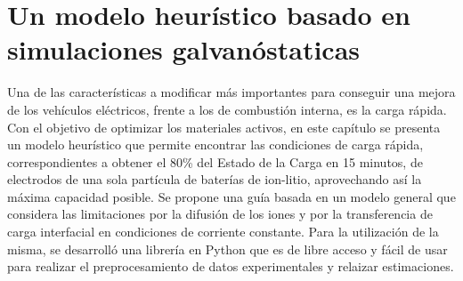 \chapter{Un modelo heurístico basado en simulaciones galvanóstaticas}\label{ch:un}
\thispagestyle{empty}

\vspace{50pt}

\begin{adjustwidth}{50pt}{50pt}
    Una de las características a modificar más importantes para conseguir una mejora de los 
    vehículos eléctricos, frente a los de combustión interna, es la carga rápida.
    Con el objetivo de optimizar los materiales activos, en este
    capítulo se presenta un modelo heurístico que permite encontrar las 
    condiciones de carga rápida, correspondientes a obtener el 80\% del Estado de la Carga en 15 minutos, de
    electrodos de una sola partícula de baterías de ion-litio, aprovechando así
    la máxima capacidad posible. Se propone una guía basada en un modelo general 
    que considera las limitaciones por la difusión de los iones y por la transferencia de carga interfacial
    en condiciones de corriente constante. Para la utilización de la misma, se 
    desarrolló una librería en Python que es de libre acceso y fácil de usar para 
    realizar el preprocesamiento de datos experimentales y relaizar estimaciones.
\end{adjustwidth}

\clearpage
\newpage
\thispagestyle{empty}
\mbox{}
\newpage






